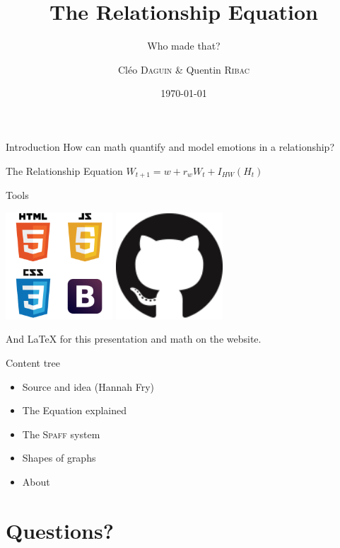 \documentclass[sthlmFooter, 10pt]{beamer}
\title{The Relationship Equation}
\subtitle{Who made that?}
\author{Cléo \textsc{Daguin} \& Quentin \textsc{Ribac}}
\date{\today}
\institute{IUT of Lannion, English class}
\begin{document}
\maketitle

\begin{frame}{Introduction}
\alert{How can math quantify and model emotions in a relationship?}
\begin{block}{The Relationship Equation}
$
W_{t+1} = w + r_w W_t + I_{HW}(H_t)
$
\end{block}
\end{frame}

\begin{frame}{Tools}
\begin{center}
\includegraphics[width=0.3\textwidth]{quad_logos.png}
\includegraphics[width=0.3\textwidth]{github.png}

And \alert{\LaTeX} for this \alert{presentation} and \alert{math} on the website.
\end{center}
\end{frame}

\begin{frame}{Content tree}
\begin{itemize}
\item Source and idea (Hannah Fry)
\item The Equation explained
\item The \textsc{Spaff} system
\item Shapes of graphs
\item About
\end{itemize}
\end{frame}


\section{Questions?}
\end{document}
